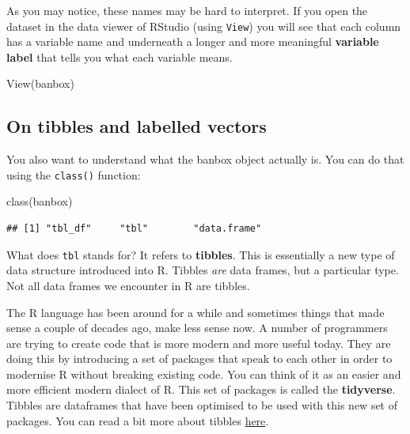 \documentclass[
]{book}
\newenvironment{Shaded}{\begin{snugshade}}{\end{snugshade}}
\newcommand{\FunctionTok}[1]{\textcolor[rgb]{0.00,0.00,0.00}{#1}}
\newcommand{\NormalTok}[1]{#1}
\begin{document}
As you may notice, these names may be hard to interpret. If you open the dataset in the data viewer of RStudio (using \texttt{View}) you will see that each column has a variable name and underneath a longer and more meaningful \textbf{variable label} that tells you what each variable means.

\begin{Shaded}
\begin{Highlighting}[]
\FunctionTok{View}\NormalTok{(banbox)}
\end{Highlighting}
\end{Shaded}

\hypertarget{on-tibbles-and-labelled-vectors}{%
\subsection{On tibbles and labelled vectors}\label{on-tibbles-and-labelled-vectors}}

You also want to understand what the banbox object actually is. You can do that using the \texttt{class()} function:

\begin{Shaded}
\begin{Highlighting}[]
\FunctionTok{class}\NormalTok{(banbox)}
\end{Highlighting}
\end{Shaded}

\begin{verbatim}
## [1] "tbl_df"     "tbl"        "data.frame"
\end{verbatim}

What does \texttt{tbl} stands for? It refers to \textbf{tibbles}. This is essentially a new type of data structure introduced into R. Tibbles \emph{are} data frames, but a particular type. Not all data frames we encounter in R are tibbles.

The R language has been around for a while and sometimes things that made sense a couple of decades ago, make less sense now. A number of programmers are trying to create code that is more modern and more useful today. They are doing this by introducing a set of packages that speak to each other in order to modernise R without breaking existing code. You can think of it as an easier and more efficient modern dialect of R. This set of packages is called the \textbf{tidyverse}. Tibbles are dataframes that have been optimised to be used with this new set of packages. You can read a bit more about tibbles \href{http://r4ds.had.co.nz/tibbles.html}{here}.
\end{document}
